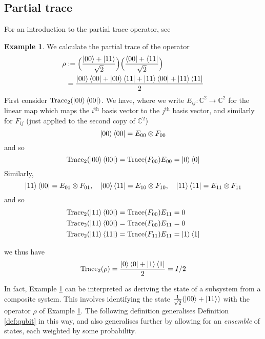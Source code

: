 \documentclass[12pt]{article}
\theoremstyle{plain}
\theoremstyle{definition}
\newtheorem{example}[thm]{Example}
\newcommand{\bb}[1]{\mathbb{#1}}
\newcommand{\lto}{\longrightarrow}
\begin{document}
	\subsection{Partial trace}
	For an introduction to the partial trace operator, see \cite{CommutativeAlgebra}
	\begin{example}\label{ex:Bell_operator}
		We calculate the partial trace of the operator
		\begin{align*}
			\rho &:= \Big(\frac{\ket{00} + \ket{11}}{\sqrt{2}}\Big)\Big(\frac{\bra{00} + \bra{11}}{\sqrt{2}}\Big)\\
			&= \frac{\ket{00}\bra{00} + \ket{00}\bra{11} + \ket{11}\bra{00} + \ket{11}\bra{11}}{2}
		\end{align*}
		First consider $\operatorname{Trace}_2(\ket{00}\bra{00})$. We have, where we write $E_{ij}: \bb{C}^2 \lto \bb{C}^2$ for the linear map which maps the $i^{\text{th}}$ basis vector to the $j^{\text{th}}$ basis vector, and similarly for $F_{ij}$ (just applied to the second copy of $\bb{C}^2$)
		\begin{equation}
			\ket{00}\bra{00} = E_{00} \otimes F_{00}
		\end{equation}
		and so
		\begin{equation}
			\operatorname{Trace}_2(\ket{00}\bra{00}) = \operatorname{Trace}(F_{00})E_{00} = \ket{0}\bra{0}
		\end{equation}
		Similarly,
		\begin{equation}
			\ket{11}\bra{00} = E_{01}\otimes F_{01},\quad \ket{00}\bra{11} = E_{10} \otimes F_{10},\quad \ket{11}\bra{11} = E_{11} \otimes F_{11}
		\end{equation}
		and so
		\begin{align}
			\operatorname{Trace}_2(\ket{11}\bra{00}) = \operatorname{Trace}(F_{00})E_{11} &= 0\\
			\operatorname{Trace}_2(\ket{11}\bra{00}) = \operatorname{Trace}(F_{00})E_{11} &= 0\\
			\operatorname{Trace}_2(\ket{11}\bra{11}) = \operatorname{Trace}(F_{11})E_{11} &= \ket{1}\bra{1}
		\end{align}
	\end{example}
	we thus have
	\begin{equation}\label{eq:partial_trace_ex}
		\operatorname{Trace}_2(\rho) = \frac{\ket{0}\bra{0} + \ket{1}\bra{1}}{2} = I/2
	\end{equation}

In fact, Example \ref{ex:Bell_operator} can be interpreted as deriving the state of a subsystem from a composite system. This involves identifying the state $\frac{1}{\sqrt{2}}(\ket{00} + \ket{11})$ with the operator $\rho$ of Example \ref{ex:Bell_operator}. The following definition generalises Definition \ref{def:qubit} in this way, and also generalises further by allowing for an \emph{ensemble} of states, each weighted by some probability.
\end{document}
